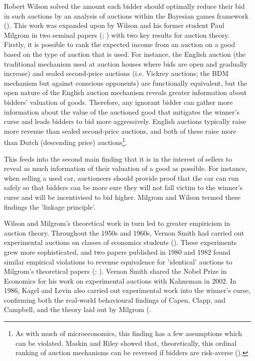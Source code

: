Robert Wilson solved the amount each bidder should optimally reduce their bid in such auctions by an analysis of auctions within the Bayesian games framework (\cite{wilsonCompetitiveBiddingAsymmetric1967}). This work was expanded upon by Wilson and his former student Paul Milgrom in two seminal papers (\cite{milgromTheoryAuctionsCompetitive1982}; \cite{milgromValueInformationSealedbid1982}) with two key results for auction theory. Firstly, it is possible to rank the expected income from an auction on a good based on the type of auction that is used. For instance, the English auction (the traditional mechanism used at auction houses where bids are open and gradually increase) and sealed second-price auctions (i.e. Vickrey auctions; the BDM mechanism but against conscious opponents) are functionally equivalent, but the open nature of the English auction mechanism reveals greater information about bidders' valuation of goods. Therefore, any ignorant bidder can gather more information about the value of the auctioned good that mitigates the winner's curse and leads bidders to bid more aggressively. English auctions typically raise more revenue than sealed second-price auctions, and both of these raise more than Dutch (descending price) auctions\footnote{As with much of microeconomics, this finding has a few assumptions which can be violated. Maskin and Riley showed that, theoretically, this ordinal ranking of auction mechanisms can be reversed if bidders are risk-averse (\cite{maskinOptimalAuctionsRisk1984}).}.

This feeds into the second main finding that it is in the interest of sellers to reveal as much information of their valuation of a good as possible. For instance, when selling a used car, auctioneers should provide proof that the car can run safely so that bidders can be more sure they will not fall victim to the winner's curse and will be incentivised to bid higher. Milgrom and Wilson termed these findings the 'linkage principle'.

Wilson and Milgrom's theoretical work in turn led to greater empiricism in auction theory. Throughout the 1950s and 1960s, Vernon Smith had carried out experimental auctions on classes of economics students (\cite{smithRationalChoiceContrast1991}). These experiments grew more sophisticated, and two papers published in 1980 and 1982 found similar empirical violations to revenue equivalence for 'identical' auctions to Milgrom's theoretical papers (\cite{coppingerIncentivesBehaviourEnglish1980}; \cite{coxjamescTheoryBehaviorSingle1982}). Vernon Smith shared the Nobel Prize in Economics for his work on experimental auctions with Kahneman in 2002. In 1986, Kagel and Levin also carried out experimental work into the winner's curse, confirming both the real-world behavioural findings of Capen, Clapp, and Campbell, and the theory laid out by Milgrom (\cite{kagelWinnersCursePublic1986}.

